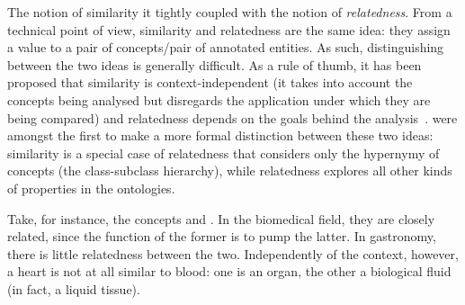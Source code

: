 The notion of similarity it tightly coupled with the notion of \emph{relatedness}. From a technical point of view, similarity and relatedness are the same idea: they assign a value to a pair of concepts\slash pair of annotated entities. As such, distinguishing between the two ideas is generally difficult. As a rule of thumb, it has been proposed that similarity is context-independent (it takes into account the concepts being analysed but disregards the application under which they are being compared) and relatedness depends on the goals behind the analysis~\citep{Budanitsky1999}. \citet{Pedersen2007} were amongst the first to make a more formal distinction between these two ideas: similarity is a special case of relatedness that considers only the hypernymy of concepts (the class-subclass hierarchy), while relatedness explores all other kinds of properties in the ontologies.

Take, for instance, the concepts  and . In the biomedical field, they are closely related, since the function of the former is to pump the latter. In gastronomy, there is little relatedness between the two. Independently of the context, however, a heart is not at all similar to blood: one is an organ, the other a biological fluid (in fact, a liquid tissue).

